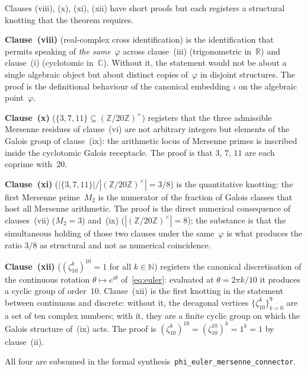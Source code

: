 \documentclass[11pt]{amsart}
\theoremstyle{definition}
\newcommand{\golden}{\varphi}
\newcommand{\Ztwenty}{(\mathbb{Z}/20\mathbb{Z})^{\times}}
\newcommand{\lean}[1]{\texttt{#1}}
\begin{document}
Clauses (viii), (x), (xi), (xii) have short proofs but each registers
a structural knotting that the theorem requires.

\textbf{Clause~(viii)} (real-complex cross identification) is the
identification that permits speaking of \emph{the same}~$\golden$
across clause~(iii) (trigonometric in~$\mathbb{R}$) and clause~(i)
(cyclotomic in~$\mathbb{C}$).  Without it, the statement would not be
about a single algebraic object but about distinct copies
of~$\golden$ in disjoint structures.  The proof is the definitional
behaviour of the canonical embedding $\iota$ on the algebraic
point~$\golden$.

\textbf{Clause~(x)} ($\{3,7,11\}\subseteq\Ztwenty$) registers that
the three admissible Mersenne residues of clause~(vi) are not
arbitrary integers but elements of the Galois group of clause~(ix):
the arithmetic locus of Mersenne primes is inscribed inside the
cyclotomic Galois receptacle.  The proof is that $3$, $7$, $11$ are
each coprime with~$20$.

\textbf{Clause~(xi)} ($|\{3,7,11\}|/|\Ztwenty|=3/8$) is the
quantitative knotting: the first Mersenne prime~$M_{2}$ is the
numerator of the fraction of Galois classes that host all Mersenne
arithmetic.  The proof is the direct numerical consequence of
clauses~(vii) ($M_{2}=3$) and~(ix) ($|\Ztwenty|=8$); the substance is
that the simultaneous holding of those two clauses under the
same~$\golden$ is what produces the ratio $3/8$ as structural and not
as numerical coincidence.

\textbf{Clause~(xii)} ($(\zeta_{10}^{k})^{10}=1$ for all
$k\in\mathbb{N}$) registers the canonical discretisation of the
continuous rotation $\theta\mapsto e^{i\theta}$ of~\eqref{eq:euler}:
evaluated at $\theta=2\pi k/10$ it produces a cyclic group of
order~$10$.  Clause~(xii) is the first knotting in the statement
between continuous and discrete: without it, the decagonal vertices
$\{\zeta_{10}^{k}\}_{k=0}^{9}$ are a set of ten complex numbers; with
it, they are a finite cyclic group on which the Galois structure
of~(ix) acts.  The proof is
$(\zeta_{10}^{k})^{10}=(\zeta_{10}^{10})^{k}=1^{k}=1$ by clause~(ii).

All four are subsumed in the formal
synthesis~\lean{phi\_euler\_mersenne\_connector}.
\end{document}

